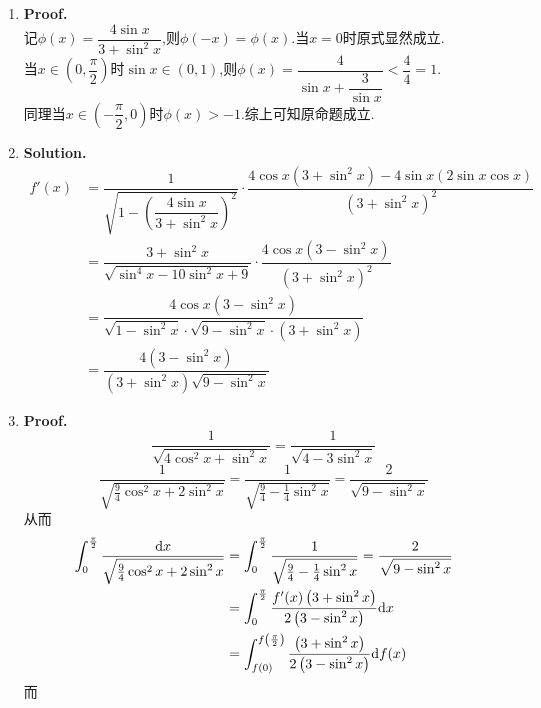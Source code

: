 \documentclass{ctexart}
\begin{document}
\begin{solution}[Solution.]
    \begin{enumerate}[label=\textbf{(\arabic*)}]
        \item \textbf{Proof.}\\
            记$\phi(x)=\dfrac{4\sin x}{3+\sin^2 x}$,则$\phi(-x)=\phi(x)$.当$x=0$时原式显然成立.\\
            当$x\in\left(0,\dfrac{\pi}{2}\right)$时$\sin x\in(0,1)$,则$\phi(x)=\dfrac{4}{\sin{x}+\dfrac{3}{\sin x}}<\dfrac{4}{4}=1$.\\
            同理当$x\in\left(-\dfrac{\pi}{2},0\right)$时$\phi(x)>-1$.综上可知原命题成立.
        \item \textbf{Solution.}
            \begin{align*}
                f'(x)
                &= \dfrac{1}{\sqrt{1-\left(\dfrac{4\sin x}{3+\sin^2 x}\right)^2}}\cdot\dfrac{4\cos x\left(3+\sin^2 x\right)-4\sin x\left(2\sin x\cos x\right)}{\left(3+\sin^2 x\right)^2} \\
                &= \dfrac{3+\sin^2 x}{\sqrt{\sin^4 x-10\sin^2 x+9}}\cdot\dfrac{4\cos x\left(3-\sin^2 x\right)}{\left(3+\sin^2 x\right)^2} \\
                &= \dfrac{4\cos x\left(3-\sin^2 x\right)}{\sqrt{1-\sin^2 x}\cdot\sqrt{9-\sin^2 x}\cdot\left(3+\sin^2 x\right)} \\
                &= \dfrac{4\left(3-\sin^2 x\right)}{\left(3+\sin^2 x\right)\sqrt{9-\sin^2 x}}
            \end{align*}
        \item \textbf{Proof.}
            $$\dfrac{1}{\sqrt{4\cos^2 x+\sin^2 x}}=\dfrac{1}{\sqrt{4-3\sin^2 x}}$$
            $$\dfrac{1}{\sqrt{\frac{9}{4}\cos^2 x+2\sin^2 x}}=\dfrac{1}{\sqrt{\frac{9}{4}-\frac{1}{4}\sin^2 x}}=\dfrac{2}{\sqrt{9-\sin^2 x}}$$
            从而\begin{align*}
                \int_{0}^{\frac{\pi}{2}}{\dfrac{\mathrm{d} x}{\sqrt{\frac{9}{4}\cos^2{x}+2\sin^2{x}}}}
                &= \int_{0}^{\frac{\pi}{2}}\dfrac{1}{\sqrt{\frac{9}{4}-\frac{1}{4}\sin^2 x}}=\dfrac{2}{\sqrt{9-\sin^2 x}} \\
                &= \int_{0}^{\frac{\pi}{2}}\dfrac{f'(x)\left(3+\sin^2 x\right)}{2\left(3-\sin^2 x\right)}\mathrm{d} x\\
                &= \int_{f(0)}^{f\left(\frac{\pi}{2}\right)}\dfrac{\left(3+\sin^2 x\right)}{2\left(3-\sin^2 x\right)}\mathrm{d} f(x)
            \end{align*}
            而\begin{align*}

\end{align*}
\end{enumerate}
\end{solution}
\end{document}
